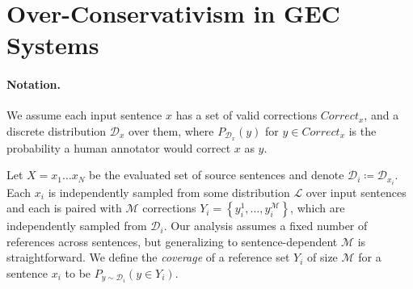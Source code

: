 \documentclass[letterpaper, 11pt]{article}
\begin{document}
%
%
%
%

\section{Over-Conservativism in GEC Systems}\label{sec:formal_conservatism}
%
%

\paragraph{Notation.}
We assume each input sentence $x$ has a set of valid corrections $Correct_x$,
and a discrete distribution $\mathcal{D}_x$ over them, where $P_{\mathcal{D}_x}(y)$
for $y \in Correct_x$ is the probability a human annotator would correct $x$ as $y$.

Let $X=x_{1}\ldots x_{N}$ be the evaluated set of source sentences and denote $\mathcal{D}_{i}\coloneqq \mathcal{D}_{x_i}$. Each $x_{i}$ is independently sampled from some 
distribution $\mathcal{L}$ over input sentences 
and each is paired with $\mathcal{M}$ corrections $Y_i = \left\{y_{i}^{1},\ldots, y_{i}^{\mathcal{M}}\right\}$,
which are independently sampled from $\mathcal{D}_{i}$. Our analysis assumes a fixed number of references across sentences, 
but generalizing to sentence-dependent $\mathcal{M}$ is straightforward.
We define the {\it coverage} of a reference set $Y_i$ of size $\mathcal{M}$ for a sentence $x_i$ to be $P_{y \sim \mathcal{D}_i}(y \in Y_i)$.
\end{document}
